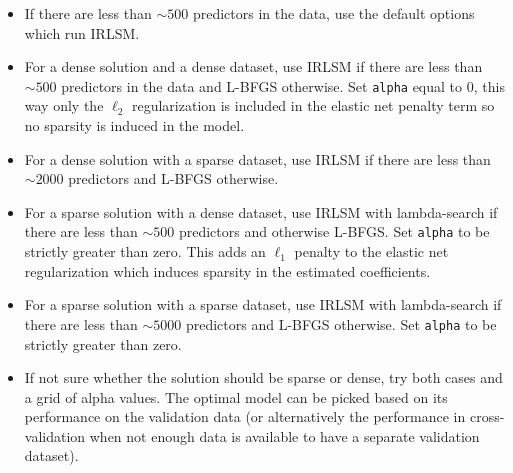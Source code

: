 \begin{itemize}
\item If there are less than $\sim 500$ predictors in the data, use the default options which run IRLSM.
\item For a dense solution and a dense dataset, use IRLSM if there are less than $\sim 500$ predictors in the data and L-BFGS otherwise. Set \texttt{alpha} equal to 0, this way only the $\ell_2$ regularization is included in the elastic net penalty term so no sparsity is induced in the model.
\item For a dense solution with a sparse dataset, use IRLSM if there are less than $\sim 2000$ predictors and L-BFGS otherwise.  
\item For a sparse solution with a dense dataset, use IRLSM with lambda-search if there are less than $\sim 500$ predictors and otherwise L-BFGS. Set \texttt{alpha} to be strictly greater than zero. This adds an $\ell_1$ penalty to the elastic net regularization which induces sparsity in the estimated coefficients. 
\item For a sparse solution with a sparse dataset, use IRLSM with lambda-search if there are less than $\sim 5000$ predictors and L-BFGS otherwise. Set \texttt{alpha} to be strictly greater than zero. 
\item If not sure whether the solution should be sparse or dense, try both cases and a grid of alpha values. The optimal model can be picked based on its performance on the validation data (or alternatively the performance in cross-validation when not enough data is available to have a separate validation dataset).      
\end{itemize}

\vspace{0.7cm}


